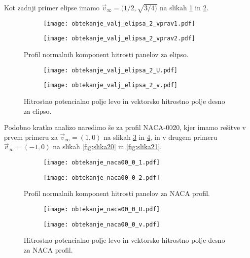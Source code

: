 \documentclass[12pt,a4paper]{article}
\begin{document}
\noindent Kot zadnji primer elipse imamo $\vec{v}_{\infty}=(1/2,\sqrt{3/4)}$ na slikah \ref{fig:slika16} in \ref{fig:slika17}.

\begin{figure}[H]
    \centering
    \begin{subfigure}[b]{0.45\textwidth}  			
        \texttt{[image: obtekanje\_valj\_elipsa\_2\_vprav1.pdf]}
    \end{subfigure}
    \begin{subfigure}[b]{0.45\textwidth}  			
        \texttt{[image: obtekanje\_valj\_elipsa\_2\_vprav2.pdf]}
    \end{subfigure}
    \caption{Profil normalnih komponent hitrosti panelov za elipso.} \label{fig:slika16}
\end{figure}

\begin{figure}[H]
    \centering
    \begin{subfigure}[b]{0.45\textwidth}  			
        \texttt{[image: obtekanje\_valj\_elipsa\_2\_U.pdf]}
    \end{subfigure}
    \begin{subfigure}[b]{0.45\textwidth}  			
        \texttt{[image: obtekanje\_valj\_elipsa\_2\_v.pdf]}
    \end{subfigure}
    \caption{Hitrostno potencialno polje levo in vektorsko hitrostno polje desno za elipso.} \label{fig:slika17}
\end{figure}

Podobno kratko analizo naredimo še za profil  NACA-0020, kjer imamo rešitve v prvem primeru za $\vec{v}_{\infty}=(1,0)$ na slikah \ref{fig:slika18} in \ref{fig:slika19}, in v drugem primeru $\vec{v}_{\infty}=(-1,0)$ na slikah \ref{fig:slika20} in \ref{fig:slika21}.

\begin{figure}[H]
    \centering
    \begin{subfigure}[b]{0.45\textwidth}  			
        \texttt{[image: obtekanje\_naca00\_0\_1.pdf]}
    \end{subfigure}
    \begin{subfigure}[b]{0.45\textwidth}  			
        \texttt{[image: obtekanje\_naca00\_0\_2.pdf]}
    \end{subfigure}
    \caption{Profil normalnih komponent hitrosti panelov za NACA profil.} \label{fig:slika18}
\end{figure}

\begin{figure}[H]
    \centering
    \begin{subfigure}[b]{0.45\textwidth}  			
        \texttt{[image: obtekanje\_naca00\_0\_U.pdf]}
    \end{subfigure}
    \begin{subfigure}[b]{0.45\textwidth}  			
        \texttt{[image: obtekanje\_naca00\_0\_v.pdf]}
    \end{subfigure}
    \caption{Hitrostno potencialno polje levo in vektorsko hitrostno polje desno za NACA profil.} \label{fig:slika19}
\end{figure}
\end{document}
